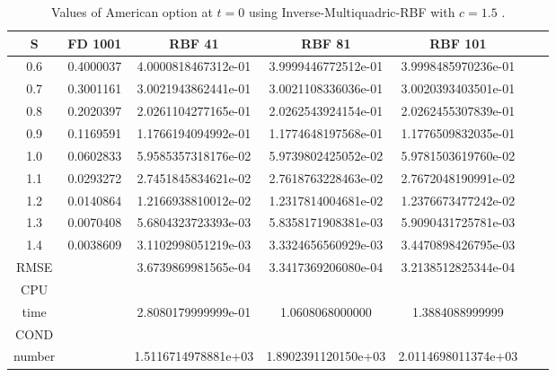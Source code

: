 \documentclass[12pt]{article}
\numberwithin{equation}{subsection} %
\begin{document}
\begin{table}[h]

\caption{Values of American option at $t=0$ using
Inverse-Multiquadric-RBF with $c=1.5$ .}\label{Tab_1DFinal}
\centering
\vspace{5mm}
\begin{tabular}{|c|c|c|c|c|c|c|}
  \hline
  S & FD 1001  & RBF 41 & RBF 81 & RBF 101 \\
  \hline
  0.6 & 0.4000037 &  4.0000818467312e-01 & 3.9999446772512e-01 & 3.9998485970236e-01 \\
  0.7 & 0.3001161  & 3.0021943862441e-01 & 3.0021108336036e-01 &3.0020393403501e-01 \\
  0.8 & 0.2020397  & 2.0261104277165e-01 & 2.0262543924154e-01 & 2.0262455307839e-01 \\
  0.9 & 0.1169591  & 1.1766194094992e-01 &  1.1774648197568e-01 &  1.1776509832035e-01\\
  1.0 & 0.0602833  & 5.9585357318176e-02 & 5.9739802425052e-02 &  5.9781503619760e-02\\
  1.1 & 0.0293272  & 2.7451845834621e-02 & 2.7618763228463e-02 &   2.7672048190991e-02\\
  1.2 & 0.0140864  &  1.2166938810012e-02 &  1.2317814004681e-02  & 1.2376673477242e-02 \\
  1.3 & 0.0070408  &  5.6804323723393e-03 & 5.8358171908381e-03 & 5.9090431725781e-03 \\
  1.4 & 0.0038609  & 3.1102998051219e-03 &  3.3324656560929e-03&  3.4470898426795e-03\\
  \hline
  RMSE &   & 3.6739869981565e-04 &3.3417369206080e-04 & 3.2138512825344e-04\\
  \hline
  CPU &   &  &  &  \\
  time  &   &  2.8080179999999e-01 & 1.0608068000000 & 1.3884088999999 \\
  \hline
   COND &   &  &  &  \\
  number  &   & 1.5116714978881e+03 &  1.8902391120150e+03 & 2.0114698011374e+03 \\
  \hline
\end{tabular}

\end{table}
\end{document}
